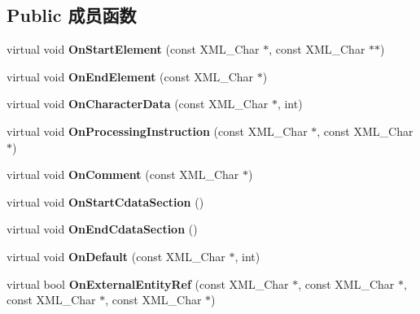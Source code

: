 \subsection*{Public 成员函数}
\begin{DoxyCompactItemize}
\item 
\hypertarget{class_c_expat_a390c4d7d243247ac20d23fdda8e8009c}{virtual void {\bfseries On\+Start\+Element} (const X\+M\+L\+\_\+\+Char $\ast$, const X\+M\+L\+\_\+\+Char $\ast$$\ast$)}\label{class_c_expat_a390c4d7d243247ac20d23fdda8e8009c}

\item 
\hypertarget{class_c_expat_a82959ab8c5ff39f8b6eedf538f49bdb2}{virtual void {\bfseries On\+End\+Element} (const X\+M\+L\+\_\+\+Char $\ast$)}\label{class_c_expat_a82959ab8c5ff39f8b6eedf538f49bdb2}

\item 
\hypertarget{class_c_expat_a8aa7414351a4428bc067d28f11682aa0}{virtual void {\bfseries On\+Character\+Data} (const X\+M\+L\+\_\+\+Char $\ast$, int)}\label{class_c_expat_a8aa7414351a4428bc067d28f11682aa0}

\item 
\hypertarget{class_c_expat_ad9a87ccf0ad4f93a81ed3a38f6c78a61}{virtual void {\bfseries On\+Processing\+Instruction} (const X\+M\+L\+\_\+\+Char $\ast$, const X\+M\+L\+\_\+\+Char $\ast$)}\label{class_c_expat_ad9a87ccf0ad4f93a81ed3a38f6c78a61}

\item 
\hypertarget{class_c_expat_a67c735cb9c72fbbbf0fc3fbfd571dac4}{virtual void {\bfseries On\+Comment} (const X\+M\+L\+\_\+\+Char $\ast$)}\label{class_c_expat_a67c735cb9c72fbbbf0fc3fbfd571dac4}

\item 
\hypertarget{class_c_expat_a1ca4bcb887c156a9802d486de954d9c3}{virtual void {\bfseries On\+Start\+Cdata\+Section} ()}\label{class_c_expat_a1ca4bcb887c156a9802d486de954d9c3}

\item 
\hypertarget{class_c_expat_ab35310a236f2035f8e1a0fda76ec7e31}{virtual void {\bfseries On\+End\+Cdata\+Section} ()}\label{class_c_expat_ab35310a236f2035f8e1a0fda76ec7e31}

\item 
\hypertarget{class_c_expat_abad14bd65bcea95a1e5f5a84e8496db6}{virtual void {\bfseries On\+Default} (const X\+M\+L\+\_\+\+Char $\ast$, int)}\label{class_c_expat_abad14bd65bcea95a1e5f5a84e8496db6}

\item 
\hypertarget{class_c_expat_ac44b5ed22e487291e01ee532e9451d2c}{virtual bool {\bfseries On\+External\+Entity\+Ref} (const X\+M\+L\+\_\+\+Char $\ast$, const X\+M\+L\+\_\+\+Char $\ast$, const X\+M\+L\+\_\+\+Char $\ast$, const X\+M\+L\+\_\+\+Char $\ast$)}\label{class_c_expat_ac44b5ed22e487291e01ee532e9451d2c}


\end{DoxyCompactItemize}
